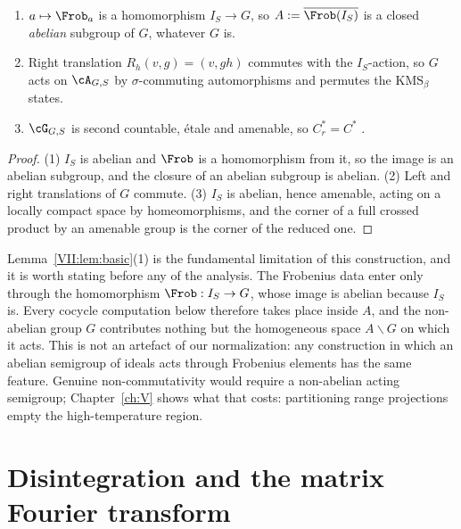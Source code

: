\begin{lemma}\label{VII:lem:basic}
\begin{enumerate}
\item $a\mapsto\Frob_a$ is a homomorphism $I_S\to G$, so
$A:=\overline{\Frob(I_S)}$ is a closed \emph{abelian} subgroup of $G$, whatever $G$ is.
\item Right translation $R_h(v,g)=(v,gh)$ commutes with the $I_S$-action, so $G$ acts on
$\cA_{G,S}$ by $\sigma$-commuting automorphisms and permutes the $\mathrm{KMS}_\beta$ states.
\item $\cG_{G,S}$ is second countable, étale and amenable, so $C^*_r=C^*$ \cite{RenaultGroupoid}.
\end{enumerate}
\end{lemma}

\begin{proof}
(1) $I_S$ is abelian and $\Frob$ is a homomorphism from it, so the image is an abelian
subgroup, and the closure of an abelian subgroup is abelian. (2) Left and right translations
of $G$ commute. (3) $I_S$ is abelian, hence amenable, acting on a locally compact space by homeomorphisms,
and the corner of a full crossed product by an amenable group is the corner of the reduced
one.
\end{proof}

\begin{remark}\label{VII:rem:abelian}
Lemma~\ref{VII:lem:basic}(1) is the fundamental limitation of this construction, and it is worth
stating before any of the analysis. The Frobenius data enter only through the homomorphism
$\Frob:I_S\to G$, whose image is abelian because $I_S$ is. Every cocycle computation below
therefore takes place inside $A$, and the non-abelian group $G$ contributes nothing but the
homogeneous space $A\backslash G$ on which it acts. This is not an artefact of our
normalization: any construction in which an abelian semigroup of ideals acts through
Frobenius elements has the same feature. Genuine non-commutativity would require a
non-abelian acting semigroup; Chapter~\ref{ch:V} shows what that costs: partitioning
range projections empty the high-temperature region.
\end{remark}

\section{Disintegration and the matrix Fourier transform}

